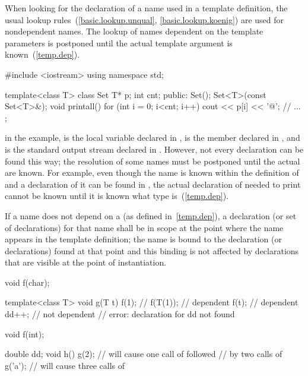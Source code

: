\pnum
When looking for the declaration of a name used in a template definition,
the usual lookup rules~(\ref{basic.lookup.unqual}, \ref{basic.lookup.koenig})
are used for nondependent names.
The lookup of names dependent on the template parameters
is postponed until the actual template argument is known~(\ref{temp.dep}).
\enterexample

\begin{codeblock}
#include <iostream>
using namespace std;

template<class T> class Set {
	T* p;
	int cnt;
public:
	Set();
	Set<T>(const Set<T>&);
	void printall()
	{
		for (int i = 0; i<cnt; i++)
			cout << p[i] << '@\textbackslash@n';
	}
	// ...
};
\end{codeblock}

in the example,
is the local variable
declared in
,
is the member
declared in
,
and
is the standard output stream declared in
.
However, not every declaration can be found this way; the resolution of
some names must be postponed
until the actual
are known.
For example, even though the name
is known within the definition of
and a declaration of it can be found in
,
the actual declaration of
needed to print
cannot be known until it is known what type
is~(\ref{temp.dep}).
\exitexample

\pnum
If a name does not depend on a
(as defined in~\ref{temp.dep}), a declaration (or set of declarations) for that
name shall be in scope at the point where the name appears in the template
definition; the name is bound to the declaration (or declarations) found
at that point and this binding is not affected by declarations that are
visible at the point of instantiation.
\enterexample

\begin{codeblock}
void f(char);

template<class T> void g(T t)
{
	f(1);			// 
	f(T(1));		// dependent
	f(t);			// dependent
	dd++;			// not dependent
				// error: declaration for dd not found
}

void f(int);

double dd;
void h()
{
	g(2);			// will cause one call of  followed
				// by two calls of 
	g('a');			// will cause three calls of 
}
\end{codeblock}
\exitexampleb

